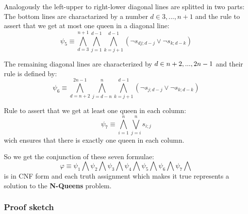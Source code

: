 \documentclass[11pt]{article}
\begin{document}
\noindent Analogously the left-upper to right-lower diagonal lines are
splitted in two parts: The bottom lines are charactarized by a number $d \in 
{3,...,n+1}$ and the\newline
rule to assert that we get at most one queen in a diagonal line: 
\begin{equation*}
\psi_5 \equiv
\bigwedge_{d=3}^{n+1}\bigwedge_{j=1}^{d-1}\bigwedge_{k=j+1}^{d-1}(\neg
s_{dj;d-j} \vee \neg s_{k;d-k})
\end{equation*}

\noindent The remaining diagonal lines are characterized by $d \in {%
n+2,...,2n-1}$ and their rule is defined by: 
\begin{equation*}
\psi_6 \equiv
\bigwedge_{d=n+2}^{2n-1}\bigwedge_{j=d-n}^{n}\bigwedge_{k=j+1}^{d-1}(\neg
s_{j;d-j} \vee \neg s_{k;d-k})
\end{equation*}

\noindent Rule to assert that we get at least one queen in each column: 
\begin{equation*}
\psi_7 \equiv \bigwedge_{i=1}^{n}\bigvee_{j=i}^{n}s_{i;j}
\end{equation*}
wich ensures that there is exactly one queen in each column.

\noindent So we get the conjunction of these seven formulae: 
\begin{equation*}
\varphi \equiv \psi _{1}\bigwedge \psi _{2}\bigwedge \psi _{3}\bigwedge \psi
_{4}\bigwedge \psi _{5}\bigwedge \psi _{6}\bigwedge \psi _{7}\bigwedge 
\end{equation*}%
is in CNF form and each truth assignment which makes it true represents a
solution to the \textbf{N-Queens} problem.

\subsubsection{Proof sketch}
\end{document}
